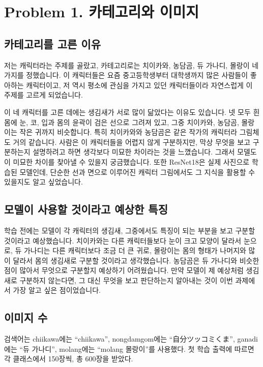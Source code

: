 \documentclass[11pt]{article}
\begin{document}
\makeheader

\section*{Problem 1. 카테고리와 이미지}

\subsection*{카테고리를 고른 이유}
저는 캐릭터라는 주제를 골랐고, 카테고리로는 치이카와, 농담곰, 듀 가나디,
몰랑이 네 가지를 정했습니다. 이 캐릭터들은 요즘 중고등학생부터 대학생까지
많은 사람들이 좋아하는 캐릭터이고, 저 역시 평소에 관심을 가지고 있던
캐릭터들이라 자연스럽게 이 주제를 고르게 되었습니다.

이 네 캐릭터를 고른 데에는 생김새가 서로 많이 닮았다는 이유도 있습니다.
넷 모두 흰 몸에 눈, 코, 입과 몸의 윤곽이 검은 선으로 그려져 있고, 그중
치이카와, 농담곰, 몰랑이는 작은 귀까지 비슷합니다. 특히 치이카와와
농담곰은 같은 작가의 캐릭터라 그림체도 거의 같습니다. 사람은 이 캐릭터들을
어렵지 않게 구분하지만, 막상 무엇을 보고 구분하는지 설명하려고 하면
생각보다 미묘한 차이라는 것을 느꼈습니다. 그래서 모델도 이 미묘한 차이를
찾아낼 수 있을지 궁금했습니다. 또한 ResNet18은 실제 사진으로 학습된
모델인데, 단순한 선과 면으로 이루어진 캐릭터 그림에서도 그 지식을 활용할
수 있을지도 알고 싶었습니다.

\subsection*{모델이 사용할 것이라고 예상한 특징}
학습 전에는 모델이 각 캐릭터의 생김새, 그중에서도 특징이 되는 부분을 보고
구분할 것이라고 예상했습니다. 치이카와는 다른 캐릭터들보다 눈이 크고 모양이
달라서 눈으로, 듀 가나디는 다른 캐릭터보다 조금 더 큰 귀로, 몰랑이는 몸의
형태가 나머지와 많이 달라서 몸의 생김새로 구분할 것이라고 생각했습니다.
농담곰은 듀 가나디와 비슷한 점이 많아서 무엇으로 구분할지 예상하기
어려웠습니다. 만약 모델이 제 예상처럼 생김새로 구분하지 않는다면, 그 대신
무엇을 보고 판단하는지 알아내는 것이 이번 과제에서 가장 알고 싶은 점이었습니다.

\subsection*{이미지 수}
검색어는 chiikawa에는 ``chiikawa'', nongdamgom에는 ``自分ツッコミくま'',
ganadi에는 ``듀 가나디'', molang에는 ``molang 몰랑이''를 사용했다.
첫 학습 출력에 따르면 각 클래스에서 150장씩, 총 600장을 받았다.
\end{document}
